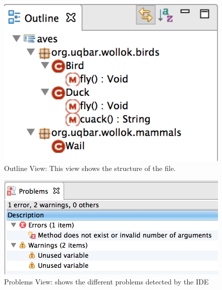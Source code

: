 \begin{figure}[ht]
    \centering
	\includegraphics[scale=0.5]{images/wollok-paper-outline.png}
    \caption{Outline View: This view shows the structure of the file.}
    \label{fig:outline.png}
\end{figure}

\begin{figure}[ht]
    \centering
	\includegraphics[scale=0.5]{images/wollok-paper-check-problemsview.png}
    \caption{Problems View: shows the different problems detected by the IDE }
    \label{fig:problemsview.png}
\end{figure}

